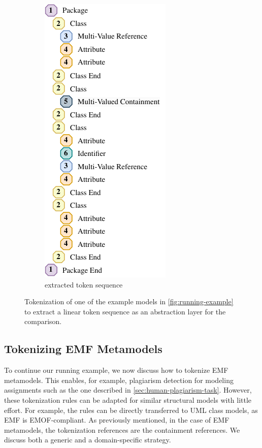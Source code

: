 \begin{figure}
\begin{subfigure}{.45\linewidth}
          \includegraphics[width=.65\textwidth]{figures/mde/tokenSequence.pdf}
          \caption{extracted token sequence}
          \label{fig:tokenization:sub2}
    \end{subfigure}
    \caption[Tokenization of Modeling Artifacts]{Tokenization of one of the example models in \autoref{fig:running-example} to extract a linear token sequence as an abstraction layer for the comparison.}
    \label{fig:tokenization}
\end{figure}

\subsection{Tokenizing EMF Metamodels}
To continue our running example, we now discuss how to tokenize \ac{EMF} metamodels. This enables, for example, plagiarism detection for modeling assignments such as the one described in \autoref{sec:human-plagiarism-task}. However, these tokenization rules can be adapted for similar structural models with little effort. For example, the rules can be directly transferred to \ac{UML} class models, as \ac{EMF} is EMOF-compliant. As previously mentioned, in the case of \ac{EMF} metamodels, the tokenization references are the containment references. We discuss both a generic and a domain-specific strategy.

